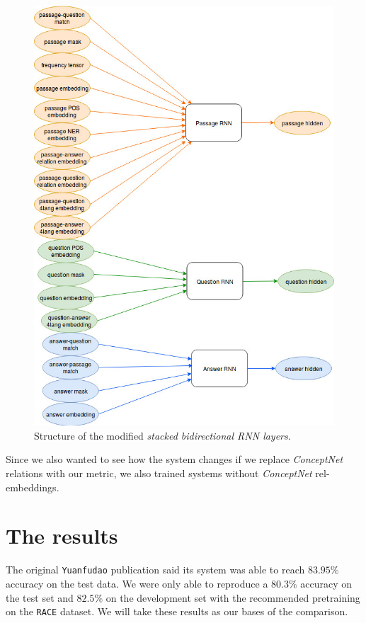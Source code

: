 \begin{figure}[h!]
	\centering
	\includegraphics[scale=0.4]{figures/TriAN_rnn_with_4lang.jpg}
	\caption{Structure of the modified \textit{stacked bidirectional RNN layers}.}
	\label{fig:rnn_4lang}
\end{figure}

Since we also wanted to see how the system changes if we replace \textit{ConceptNet} relations with our metric, we also trained systems without \textit{ConceptNet} rel-embeddings.

\FloatBarrier

\section{The results}
The original \texttt{Yuanfudao} \cite{Wang:2018} publication said its system was able to reach $83.95\%$ accuracy on the test data. We were only able to reproduce a $80.3\%$ accuracy on the test set and $82.5\%$ on the development set with the recommended pretraining on the \texttt{RACE} \cite{Lai:2017} dataset. We will take these results as our bases of the comparison.

